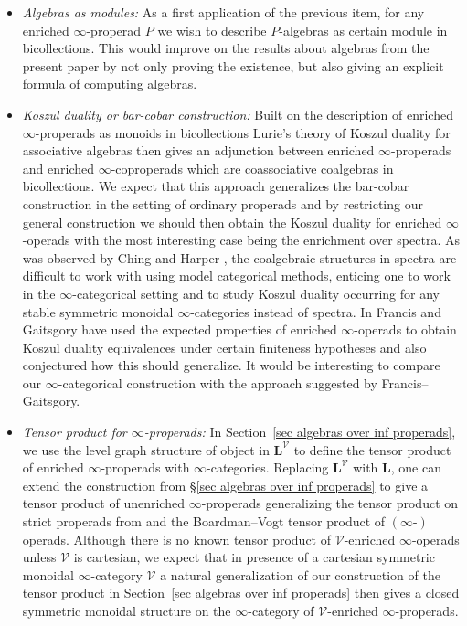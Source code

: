 \documentclass{amsart}
\numberwithin{theorem}{subsection}
\theoremstyle{definition}
\newcommand{\xV}{\mathcal{V}}
\newcommand{\levelg}{\mathbf{L}}
\newcommand{\levelV}{\levelg^\xV}
\begin{document}
\begin{itemize}[leftmargin=*]
\item \emph{Algebras as modules:} 
As a first application of the previous item, for any enriched $\infty$-properad $P$ we wish to describe $P$-algebras as certain module in bicollections.
This would improve on the results about algebras from the present paper by not only proving the existence, but also giving an explicit formula of computing algebras.
\item \emph{Koszul duality or bar-cobar construction:} 
Built on the description of enriched $\infty$-properads as monoids in bicollections Lurie's theory of Koszul duality for associative algebras \cite[\S 5.2]{ha} then gives an adjunction between enriched $\infty$-properads and enriched $\infty$-coproperads which are coassociative coalgebras in bicollections.
We expect that this approach generalizes the bar-cobar construction in the setting of ordinary properads and by restricting our general construction we should then obtain the Koszul duality for enriched $\infty$-operads with the most interesting case being the enrichment over spectra.
As was observed by Ching and Harper \cite{ChingBar,ChingHarper}, the coalgebraic structures in spectra are difficult to work with using model categorical methods, enticing one to work in the $\infty$-categorical setting and to study Koszul duality occurring for any stable symmetric monoidal $\infty$-categories instead of spectra.
In \cite{FrancisGaitsgory} Francis and Gaitsgory have used the expected properties of enriched $\infty$-operads to obtain Koszul duality equivalences under certain finiteness hypotheses and also conjectured how this should generalize.
It would be interesting to compare our $\infty$-categorical construction with the approach suggested by Francis--Gaitsgory.
\item \emph{Tensor product for $\infty$-properads:} 
In Section~\ref{sec algebras over inf properads}, we use the level graph structure of object in $\levelV$ to define the tensor product of enriched $\infty$-properads with $\infty$-categories. 
Replacing $\levelV$ with $\levelg$, one can extend the construction from \S\ref{sec algebras over inf properads} to give a tensor product of unenriched $\infty$-properads generalizing the tensor product on strict properads from \cite[\S 4.2]{hrybook} and the Boardman--Vogt tensor product of $(\infty\text{-})$operads.
Although there is no known tensor product of $\xV$-enriched $\infty$-operads unless $\xV$ is cartesian, we expect that in presence of a cartesian symmetric monoidal $\infty$-category $\xV$ a natural generalization of our construction of the tensor product in Section~\ref{sec algebras over inf properads} then gives a closed symmetric monoidal structure on the $\infty$-category of $\xV$-enriched $\infty$-properads. 

\end{itemize}
\end{document}
